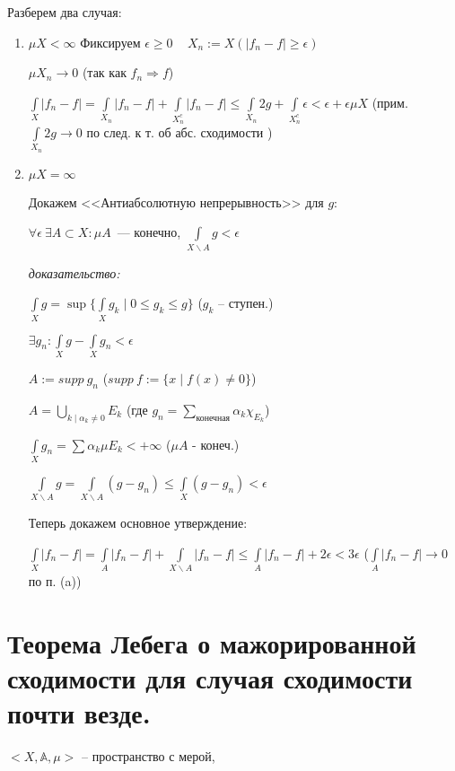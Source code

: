 \documentclass[paper=a4, fontsize=17pt]{article}
\begin{document}
\begin{flushleft}
\begin{enumerate}
	Разберем два случая:
	\begin{enumerate}
		\item $ \mu X < \infty $
		Фиксируем $ \epsilon \ge 0 $ ~ $ X_n := X(|f_n - f| \geq \epsilon) $

		$ \mu X_n \rightarrow 0 $ (так как $ f_n \Rightarrow f $)

		$ \int\limits_{X} |f_n - f| =
		\int\limits_{X_n} |f_n - f| + \int\limits_{X_n^c} |f_n - f| \leq
		\int\limits_{X_n} 2g + \int\limits_{X_n^c} \epsilon < \epsilon + \epsilon \mu X $ (прим. $ \int\limits_{X_n} 2g \rightarrow 0 $ по след. к т. об абс. сходимости )

		\item $ \mu X = \infty $

		Докажем <<Антиабсолютную непрерывность>> для $ g $:

		$ \forall \epsilon ~ \exists A \subset X: \mu A$~--- конечно,
		$ \int\limits_{X\backslash A} g < \epsilon $

		\textit{доказательство:}

		$ \int\limits_X g = \sup \{ \int\limits_{X} g_k \mid 0 \leq g_k \leq g \} $ ($ g_k $ -- ступен.)

		$ \exists g_n: \int\limits_{X} g - \int\limits_{X} g_n < \epsilon $

		$ A:= supp\ g_n $ ($ supp\ f :=  \{ x \mid f(x) \neq 0 \}$)

		$ A =  \bigcup\limits_{k \mid \alpha_k \neq 0} E_k $ (где $g_n=\sum\limits_{\text{конечная}} \alpha_k \chi_{E_k}$)

		$ \int\limits_{X} g_n  = \sum \alpha_k \mu E_k  < +\infty $ ($ \mu A $ - конеч.)

		$ \int\limits_{X\backslash A} g =
		\int\limits_{X\backslash A} (g - g_n) \leq
		\int\limits_{X} (g - g_n) < \epsilon $

		Теперь докажем основное утверждение:

		 $ \int\limits_{X} |f_n - f| =
		 \int\limits_{A} |f_n - f| + \int\limits_{X\backslash A} |f_n - f| \leq
		 \int\limits_{A} |f_n - f| + 2\epsilon < 3 \epsilon $
		 ($  \int\limits_{A} |f_n - f| \rightarrow 0$  по п. (a))
	\end{enumerate}
\end{enumerate}
\end{flushleft}
\section{Теорема Лебега о мажорированной сходимости для случая сходимости почти везде.}
$<X, \mathds{A}, \mu>$ -- пространство с мерой,
\end{document}
